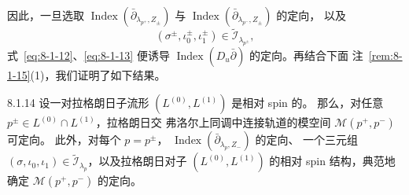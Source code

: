 因此，一旦选取
$\operatorname{Index}(\bar\partial_{\lambda_{p^+},Z_\pm})$ 与
$\operatorname{Index}(\bar\partial_{\lambda_{p^-},Z_\pm})$ 的定向，
以及
\[
 (\sigma^\pm,\iota_0^\pm,\iota_1^\pm)
 \in\widetilde{\mathcal I}_{\lambda_{p^\pm}},
\]
式~\eqref{eq:8-1-12}、\eqref{eq:8-1-13} 便诱导
$\operatorname{Index}(D_u\bar\partial)$ 的定向。再结合下面
注~\ref{rem:8-1-15}(1)，我们证明了如下结果。

\begin{theorem}{8.1.14}\label{thm:8-1-14}
设一对拉格朗日子流形 $(L^{(0)},L^{(1)})$ 是相对 spin 的。
那么，对任意 $p^\pm\in L^{(0)}\cap L^{(1)}$，拉格朗日交
弗洛尔上同调中连接轨道的模空间 $\mathcal M(p^+,p^-)$ 可定向。
此外，对每个 $p=p^\pm$，
$\operatorname{Index}(\bar\partial_{\lambda_p,Z_-})$ 的定向、
一个三元组
$(\sigma,\iota_0,\iota_1)\in
\widetilde{\mathcal I}_{\lambda_p}$，以及拉格朗日对子
$(L^{(0)},L^{(1)})$ 的相对 spin 结构，典范地确定
$\mathcal M(p^+,p^-)$ 的定向。
\end{theorem}

